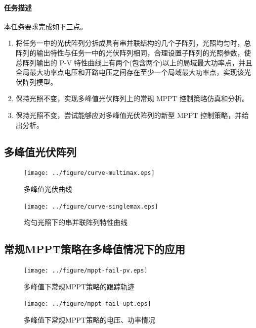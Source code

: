 \documentclass[a4paper,12pt]{article}
\begin{document}
    \paragraph{任务描述} %
    本任务要求完成如下三点。
    \begin{enumerate}[noitemsep,topsep=0pt]
    \item 将任务一中的光伏阵列分拆成具有串并联结构的几个子阵列，光照均匀时，总阵列的输出特性与任务一中的光伏阵列相同，合理设置子阵列的光照参数，使总阵列输出的 P-V 特性曲线上有两个(包含两个)以上的局域最大功率点，并且全局最大功率点电压和开路电压之间存在至少一个局域最大功率点，实现该光伏阵列模型。
    \item 保持光照不变，实现多峰值光伏阵列上的常规 MPPT 控制策略仿真和分析。
    \item 保持光照不变，尝试能够应对多峰值光伏阵列的新型 MPPT 控制策略，并给出分析。
    \end{enumerate}    
    \subsection{多峰值光伏阵列} %
    \label{sub:多峰值光伏阵列}
    \begin{figure}[htbp]
        \centering
        \texttt{[image: ../figure/curve-multimax.eps]}
        \caption{多峰值光伏曲线}
        \label{fig:curve-multimax}
    \end{figure}
    \begin{figure}[htbp]
        \centering
        \texttt{[image: ../figure/curve-singlemax.eps]}
        \caption{均匀光照下的串并联阵列特性曲线}
        \label{fig:curve-singlemax}
    \end{figure}
    \subsection{常规MPPT策略在多峰值情况下的应用} %
    \label{sub:常规mppt策略在多峰值情况下的应用}
    \begin{figure}[htbp]
        \centering
        \texttt{[image: ../figure/mppt-fail-pv.eps]}
        \caption{多峰值下常规MPPT策略的跟踪轨迹}
        \label{fig:mppt-fail-pv}
    \end{figure}
    \begin{figure}[htbp]
        \centering
        \texttt{[image: ../figure/mppt-fail-upt.eps]}
        \caption{多峰值下常规MPPT策略的电压、功率情况}
        \label{fig:mppt-fail-upt}
    \end{figure}
\end{document}
